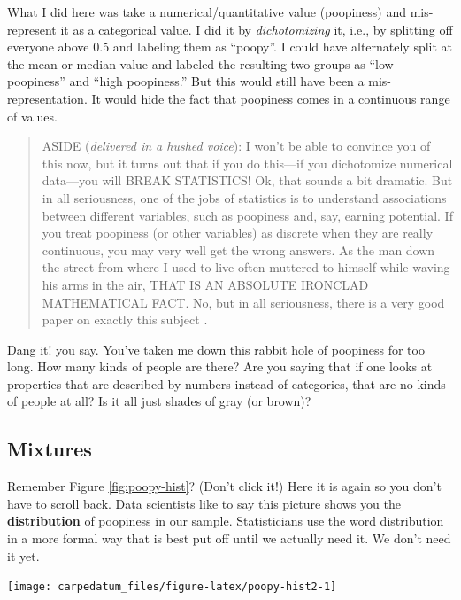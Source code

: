 \documentclass[
  openany]{book}
\begin{document}
What I did here was take a numerical/quantitative value (poopiness) and mis-represent it as a categorical value. I did it by \emph{dichotomizing} it, i.e., by splitting off everyone above 0.5 and labeling them as ``poopy''. I could have alternately split at the mean or median value and labeled the resulting two groups as ``low poopiness'' and ``high poopiness.'' But this would still have been a mis-representation. It would hide the fact that poopiness comes in a continuous range of values.

\begin{quote}
ASIDE (\emph{delivered in a hushed voice}): I won't be able to convince you of this now, but it turns out that if you do this---if you dichotomize numerical data---you will BREAK STATISTICS! Ok, that sounds a bit dramatic. But in all seriousness, one of the jobs of statistics is to understand associations between different variables, such as poopiness and, say, earning potential. If you treat poopiness (or other variables) as discrete when they are really continuous, you may very well get the wrong answers. As the man down the street from where I used to live often muttered to himself while waving his arms in the air, THAT IS AN ABSOLUTE IRONCLAD MATHEMATICAL FACT. No, but in all seriousness, there is a very good paper on exactly this subject \citep{maccallum2002}.
\end{quote}

Dang it! you say. You've taken me down this rabbit hole of poopiness for too long. How many kinds of people are there? Are you saying that if one looks at properties that are described by numbers instead of categories, that are no kinds of people at all? Is it all just shades of gray (or brown)?

\hypertarget{mixtures}{%
\subsection*{Mixtures}\label{mixtures}}

Remember Figure \ref{fig:poopy-hist}? (Don't click it!) Here it is again so you don't have to scroll back. Data scientists like to say this picture shows you the \textbf{distribution} of poopiness in our sample. Statisticians use the word distribution in a more formal way that is best put off until we actually need it. We don't need it yet.

\begin{center}\texttt{[image: carpedatum\_files/figure-latex/poopy-hist2-1]} \end{center}
\end{document}

